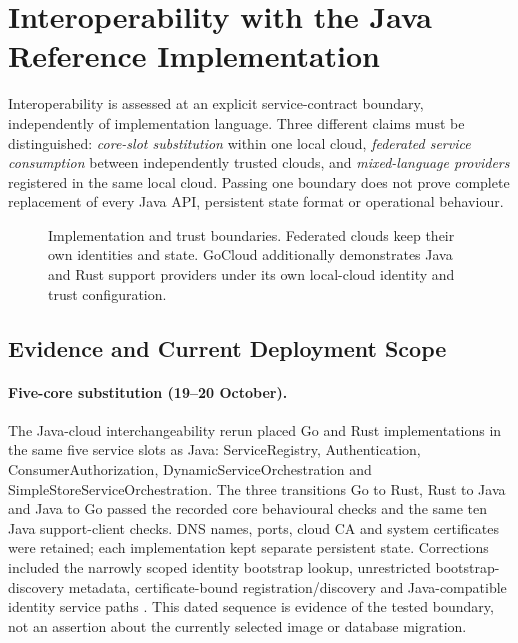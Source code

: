 \documentclass[a4paper]{arrowhead}
\begin{document}

\FloatBarrier
\section{Interoperability with the Java Reference Implementation}
\label{sec:interop}
Interoperability is assessed at an explicit service-contract boundary, independently
of implementation language. Three different claims must be distinguished:
\emph{core-slot substitution} within one local cloud, \emph{federated service
consumption} between independently trusted clouds, and \emph{mixed-language
providers} registered in the same local cloud. Passing one boundary does not prove
complete replacement of every Java API, persistent state format or operational behaviour.

\begin{figure}[htbp]
\centering

\caption{Implementation and trust boundaries. Federated clouds keep their own
identities and state. GoCloud additionally demonstrates Java and Rust support
providers under its own local-cloud identity and trust configuration.}
\label{fig:implementation-interop}
\end{figure}
\FloatBarrier

\subsection{Evidence and Current Deployment Scope}
\paragraph{Five-core substitution (19--20 October).}
The Java-cloud interchangeability rerun placed Go and Rust implementations in the
same five service slots as Java: ServiceRegistry, Authentication,
ConsumerAuthorization, DynamicServiceOrchestration and SimpleStoreServiceOrchestration.
The three transitions Go to Rust, Rust to Java and Java to Go passed the recorded
core behavioural checks and the same ten Java support-client checks. DNS names,
ports, cloud CA and system certificates were retained; each implementation kept
separate persistent state. Corrections included the narrowly scoped identity
bootstrap lookup, unrestricted bootstrap-discovery metadata, certificate-bound
registration/discovery and Java-compatible identity service paths
\cite{coreSwaps20261020}. This dated sequence is evidence of the tested boundary,
not an assertion about the currently selected image or database migration.
\end{document}
